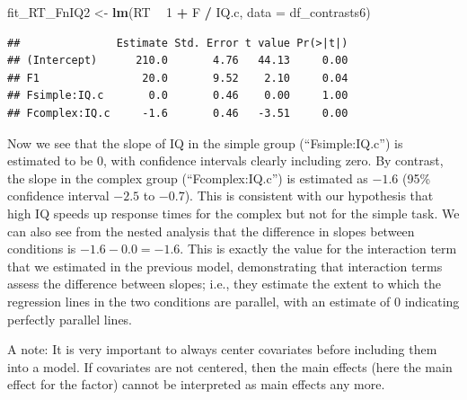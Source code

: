 \documentclass[12pt,]{krantz}
\newenvironment{Shaded}{\begin{snugshade}}{\end{snugshade}}
\newcommand{\DataTypeTok}[1]{\textcolor[rgb]{0.13,0.29,0.53}{#1}}
\newcommand{\DecValTok}[1]{\textcolor[rgb]{0.00,0.00,0.81}{#1}}
\newcommand{\KeywordTok}[1]{\textcolor[rgb]{0.13,0.29,0.53}{\textbf{#1}}}
\newcommand{\NormalTok}[1]{#1}
\newcommand{\OperatorTok}[1]{\textcolor[rgb]{0.81,0.36,0.00}{\textbf{#1}}}
\newcommand{\StringTok}[1]{\textcolor[rgb]{0.31,0.60,0.02}{#1}}
\begin{document}
\begin{Shaded}
\begin{Highlighting}[]
\NormalTok{fit_RT_FnIQ2 <-}\StringTok{ }\KeywordTok{lm}\NormalTok{(RT }\OperatorTok{~}\StringTok{ }\DecValTok{1} \OperatorTok{+}\StringTok{ }\NormalTok{F }\OperatorTok{/}\StringTok{ }\NormalTok{IQ.c,}
                 \DataTypeTok{data =}\NormalTok{ df_contrasts6)}
\end{Highlighting}
\end{Shaded}

\begin{Shaded}
\end{Shaded}

\begin{verbatim}
##               Estimate Std. Error t value Pr(>|t|)
## (Intercept)      210.0       4.76   44.13     0.00
## F1                20.0       9.52    2.10     0.04
## Fsimple:IQ.c       0.0       0.46    0.00     1.00
## Fcomplex:IQ.c     -1.6       0.46   -3.51     0.00
\end{verbatim}

Now we see that the slope of IQ in the simple group (``Fsimple:IQ.c'') is estimated to be \(0\), with confidence intervals clearly including zero. By contrast, the slope in the complex group (``Fcomplex:IQ.c'') is estimated as \(-1.6\) (95\% confidence interval \(-2.5\) to \(-0.7\)). This is consistent with our hypothesis that high IQ speeds up response times for the complex but not for the simple task.
We can also see from the nested analysis that the difference in slopes between conditions is \(-1.6 - 0.0 = -1.6\). This is exactly the value for the interaction term that we estimated in the previous model, demonstrating that interaction terms assess the difference between slopes; i.e., they estimate the extent to which the regression lines in the two conditions are parallel, with an estimate of 0 indicating perfectly parallel lines.

A note: It is very important to always center covariates before including them into a model. If covariates are not centered, then the main effects (here the main effect for the factor) cannot be interpreted as main effects any more.
\end{document}
